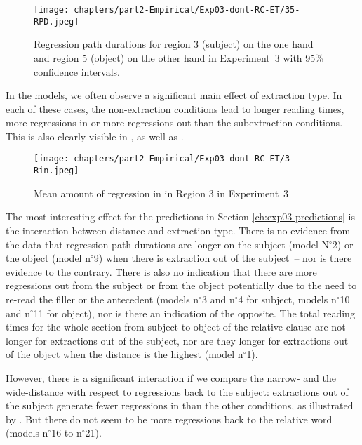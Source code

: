 \begin{figure}
    \centering
    \texttt{[image: chapters/part2-Empirical/Exp03-dont-RC-ET/35-RPD.jpeg]}
    \caption{Regression path durations for region 3 (subject) on the one hand and region 5 (object) on the other hand in Experiment~3 with 95\% confidence intervals.}
    \label{fig:exp03-35-RPD-main}
\end{figure}

In the models, we often observe a significant main effect of extraction type. In each of these cases, the non-ex\-trac\-tion conditions lead to longer reading times, more regressions in or more regressions out than the subextraction conditions. This is also clearly visible in , as well as . 

\begin{figure}
    \centering
    \texttt{[image: chapters/part2-Empirical/Exp03-dont-RC-ET/3-Rin.jpeg]}
    \caption{Mean amount of regression in in Region 3 in Experiment~3}
    \label{fig:exp03-3-Rin-prop-main}
\end{figure}

The most interesting effect for the predictions in Section \ref{ch:exp03-predictions} is the interaction between distance and extraction type. There is no evidence from the data that regression path durations are longer on the subject (model N$^{\circ}$2) or the object (model n$^{\circ}$9) when there is extraction out of the subject~-- nor is there evidence to the contrary. There is also no indication that there are more regressions out from the subject or from the object potentially due to the need to re-read the filler or the antecedent (models n$^{\circ}$3 and n$^{\circ}$4 for subject, models n$^{\circ}$10 and n$^{\circ}$11 for object), nor is there an indication of the opposite. The total reading times for the whole section from subject to object of the relative clause are not longer for extractions out of the subject, nor are they longer for extractions out of the object when the distance is the highest (model n$^{\circ}$1). 

However, there is a significant interaction if we compare the narrow- and the wide-distance with respect to regressions back to the subject: extractions out of the subject generate fewer regressions in than the other conditions, as illustrated by . But there do not seem to be more regressions back to the relative word (models n$^{\circ}$16 to n$^{\circ}$21).

